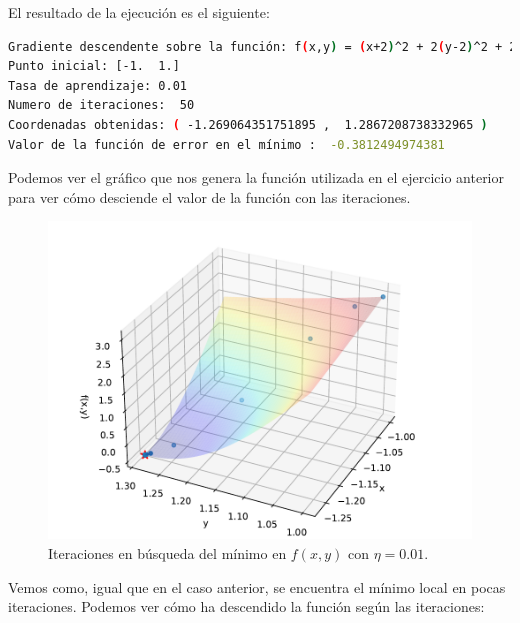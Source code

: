 \documentclass[12pt]{scrartcl}
\begin{document}
{El resultado de la ejecución es el siguiente:

\begin{lstlisting}[language=bash]
Gradiente descendente sobre la función: f(x,y) = (x+2)^2 + 2(y-2)^2 + 2 sin(2pi x) sin(2pi y)
Punto inicial: [-1.  1.]
Tasa de aprendizaje: 0.01
Numero de iteraciones:  50
Coordenadas obtenidas: ( -1.269064351751895 ,  1.2867208738332965 )
Valor de la función de error en el mínimo :  -0.3812494974381
\end{lstlisting}

Podemos ver el gráfico que nos genera la función utilizada en el ejercicio anterior para ver cómo desciende el valor de la función con las iteraciones.

\begin{figure}[H]
  \centering
  \includegraphics[scale=0.6]{media/E1-2-all-moved.pdf}
  \caption{Iteraciones en búsqueda del mínimo en $f(x,y)$ con $\eta = 0.01$.}
\end{figure}

Vemos como, igual que en el caso anterior, se encuentra el mínimo local en pocas iteraciones. Podemos ver cómo ha descendido la función según las iteraciones:

}
\end{document}
